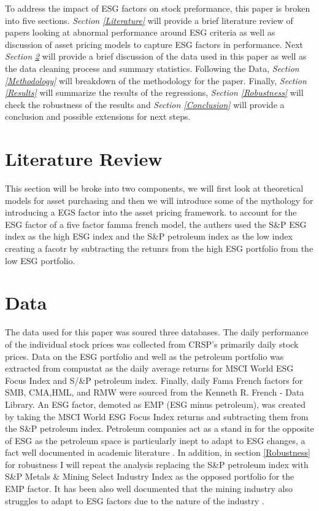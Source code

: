 \documentclass[12pt,oneside,reqno]{amsart}
\begin{document}
To address the impact of ESG factors on stock preformance, this paper is broken into five sections. \textit{Section \ref{Literature}} will provide a  brief literature review of papers looking at abnormal performance around ESG criteria as well as discussion of asset pricing models to capture ESG factors in performance. Next \textit{ Section \ref{Data}}  will provide a brief discussion of the data used in this paper as well as the data cleaning process and summary statistics. Following the Data, \textit{Section \ref{Methodology}} will breakdown of the methodology for the paper. Finally, \textit{Section \ref{Results}}  will summarize the results of the regressions, \textit{Section \ref{Robustness}} will check the robustness of the results and \textit{Section \ref{Conclusion}} will provide a conclusion and possible extensions for next steps. 

\section{Literature Review}
This section will be broke into two components, we will first look at theoretical models for asset purchasing and then we will introduce some of the mythology for introducing a EGS factor into the asset pricing framework.
to account for the ESG factor of a five factor famma french model, the authers used the S\&P ESG index as the high ESG index and the S\&P petroleum index as the low index creating a facotr by subtracting the retunrs from the high ESG portfolio from the low ESG portfolio. \cite{Gregory2020TheGP}
\label{Literature}

\section{Data}
\label{Data}
The data used for this paper was soured three databases. The daily performance of the individual stock prices was collected from CRSP's primarily daily stock prices. Data on the ESG portfolio and well as the petroleum portfolio was extracted from compustat as the daily average returns for MSCI World ESG Focus Index and S/&P petroleum index. Finally, daily Fama French factors for SMB, CMA,HML, and RMW were sourced from the Kenneth R. French - Data Library.  An ESG factor, demoted as EMP (ESG minus petroleum), was created by taking the  MSCI World ESG Focus Index returns and subtracting them from the  S\&P petroleum index. Petroleum companies act as a stand in for the opposite of ESG as the  petroleum space is particularly inept to adapt to ESG  changes, a fact well documented in academic literature \cite{Frynas2005TheFD}. In addition, in section \ref{Robustness} for robustness I will repeat the analysis replacing the  S\&P petroleum index with S\&P Metals & Mining Select Industry Index as the opposed portfolio for the EMP factor. It has been also well documented that the mining industry also struggles to adapt to ESG factors due to the nature of the industry \cite{Kapelus2002MiningCS}.
 
\end{document}
